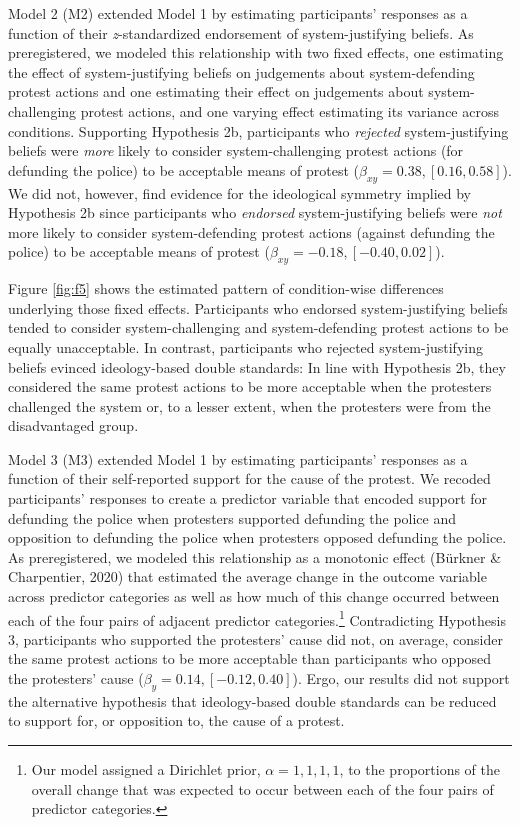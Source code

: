 \documentclass[twocolumn, 11pt, letterpaper]{article}
\begin{document}
Model 2 (M2) extended Model 1 by estimating participants' responses as a
function of their \emph{z}-standardized endorsement of system-justifying
beliefs. As preregistered, we modeled this relationship with two fixed
effects, one estimating the effect of system-justifying beliefs on
judgements about system-defending protest actions and one estimating
their effect on judgements about system-challenging protest actions, and
one varying effect estimating its variance across conditions. Supporting
Hypothesis 2b, participants who \emph{rejected} system-justifying
beliefs were \emph{more} likely to consider system-challenging protest
actions (for defunding the police) to be acceptable means of protest
(\(\beta_{xy} = 0.38, [0.16, 0.58]\)). We did not, however, find
evidence for the ideological symmetry implied by Hypothesis 2b since
participants who \emph{endorsed} system-justifying beliefs were
\emph{not} more likely to consider system-defending protest actions
(against defunding the police) to be acceptable means of protest
(\(\beta_{xy} = -0.18, [-0.40, 0.02]\)).

Figure \ref{fig:f5} shows the estimated pattern of condition-wise
differences underlying those fixed effects. Participants who endorsed
system-justifying beliefs tended to consider system-challenging and
system-defending protest actions to be equally unacceptable. In
contrast, participants who rejected system-justifying beliefs evinced
ideology-based double standards: In line with Hypothesis 2b, they
considered the same protest actions to be more acceptable when the
protesters challenged the system or, to a lesser extent, when the
protesters were from the disadvantaged group.

Model 3 (M3) extended Model 1 by estimating participants' responses as a
function of their self-reported support for the cause of the protest. We
recoded participants' responses to create a predictor variable that
encoded support for defunding the police when protesters supported
defunding the police and opposition to defunding the police when
protesters opposed defunding the police. As preregistered, we modeled
this relationship as a monotonic effect (Bürkner \& Charpentier, 2020)
that estimated the average change in the outcome variable across
predictor categories as well as how much of this change occurred between
each of the four pairs of adjacent predictor categories.\footnote{Our
  model assigned a Dirichlet prior, \(\alpha = {1, 1, 1, 1}\), to the
  proportions of the overall change that was expected to occur between
  each of the four pairs of predictor categories.} Contradicting
Hypothesis 3, participants who supported the protesters' cause did not,
on average, consider the same protest actions to be more acceptable than
participants who opposed the protesters' cause
(\(\beta_{y} = 0.14, [-0.12, 0.40]\)). Ergo, our results did not support
the alternative hypothesis that ideology-based double standards can be
reduced to support for, or opposition to, the cause of a protest.
\end{document}
